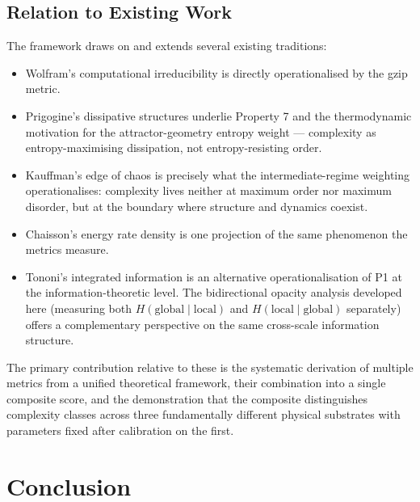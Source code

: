 \documentclass[12pt,a4paper]{article}
\begin{document}
\subsection{Relation to Existing Work}

The framework draws on and extends several existing traditions:

\begin{itemize}[noitemsep]
  \item Wolfram's computational irreducibility \citep{wolfram2002} is
    directly operationalised by the gzip metric.
  \item Prigogine's dissipative structures \citep{prigogine1977} underlie
    Property 7 and the thermodynamic motivation for the attractor-geometry
    entropy weight — complexity as entropy-maximising dissipation, not
    entropy-resisting order.
  \item Kauffman's edge of chaos \citep{kauffman1993} is precisely what
    the intermediate-regime weighting operationalises: complexity lives
    neither at maximum order nor maximum disorder, but at the boundary
    where structure and dynamics coexist.
  \item Chaisson's energy rate density \citep{chaisson2001} is one
    projection of the same phenomenon the metrics measure.
  \item Tononi's integrated information \citep{tononi2004} is an
    alternative operationalisation of P1 at the information-theoretic level.
    The bidirectional opacity analysis developed here (measuring both
    $H(\text{global} \mid \text{local})$ and $H(\text{local} \mid
    \text{global})$ separately) offers a complementary perspective on the
    same cross-scale information structure.
\end{itemize}

The primary contribution relative to these is the systematic derivation
of multiple metrics from a unified theoretical framework, their combination
into a single composite score, and the demonstration that the composite
distinguishes complexity classes across three fundamentally different
physical substrates with parameters fixed after calibration on the first.

\section{Conclusion}
\end{document}
